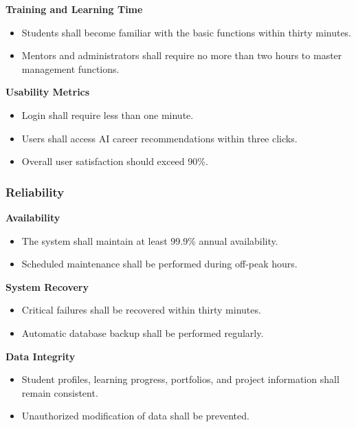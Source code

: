\textbf{Training and Learning Time}

\begin{itemize}
    \item Students shall become familiar with the basic functions within thirty minutes.
    \item Mentors and administrators shall require no more than two hours to master management functions.
\end{itemize}

\textbf{Usability Metrics}

\begin{itemize}
    \item Login shall require less than one minute.
    \item Users shall access AI career recommendations within three clicks.
    \item Overall user satisfaction should exceed 90\%.
\end{itemize}

\subsubsection{Reliability}

\textbf{Availability}

\begin{itemize}
    \item The system shall maintain at least 99.9\% annual availability.
    \item Scheduled maintenance shall be performed during off-peak hours.
\end{itemize}

\textbf{System Recovery}

\begin{itemize}
    \item Critical failures shall be recovered within thirty minutes.
    \item Automatic database backup shall be performed regularly.
\end{itemize}

\textbf{Data Integrity}

\begin{itemize}
    \item Student profiles, learning progress, portfolios, and project information shall remain consistent.
    \item Unauthorized modification of data shall be prevented.
\end{itemize}

